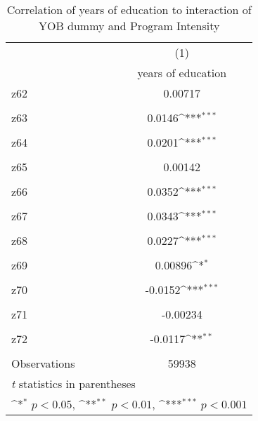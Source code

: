 \begin{table}[htbp]\centering
\def\sym#1{\ifmmode^{#1}\else\(^{#1}\)\fi}
\caption{Correlation of years of education to interaction of YOB dummy and Program Intensity \label{Ib}}
\begin{tabular}{l*{1}{c}}
\hline\hline
                    &\multicolumn{1}{c}{(1)}\\
                    &\multicolumn{1}{c}{years of education}\\
\hline
z62                 &     0.00717         \\
                    &                     \\
[1em]
z63                 &      0.0146\sym{***}\\
                    &                     \\
[1em]
z64                 &      0.0201\sym{***}\\
                    &                     \\
[1em]
z65                 &     0.00142         \\
                    &                     \\
[1em]
z66                 &      0.0352\sym{***}\\
                    &                     \\
[1em]
z67                 &      0.0343\sym{***}\\
                    &                     \\
[1em]
z68                 &      0.0227\sym{***}\\
                    &                     \\
[1em]
z69                 &     0.00896\sym{*}  \\
                    &                     \\
[1em]
z70                 &     -0.0152\sym{***}\\
                    &                     \\
[1em]
z71                 &    -0.00234         \\
                    &                     \\
[1em]
z72                 &     -0.0117\sym{**} \\
                    &                     \\
\hline
Observations        &       59938         \\
\hline\hline
\multicolumn{2}{l}{\footnotesize \textit{t} statistics in parentheses}\\
\multicolumn{2}{l}{\footnotesize \sym{*} \(p<0.05\), \sym{**} \(p<0.01\), \sym{***} \(p<0.001\)}\\
\end{tabular}
\end{table}
